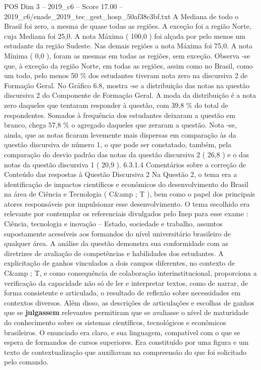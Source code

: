 \begin{textsample}{POS Dim 3 – 2019\_c6 – Score 17.00 – 2019\_c6/enade\_2019\_tec\_gest\_hosp\_50af38c3bf.txt}
A Mediana de todo o Brasil foi zero, a mesma de quase todas as regiões.
A exceção foi a região Norte, cuja Mediana foi 25,0.
A nota Máxima ( 100,0 ) foi alçada por pelo menos um estudante da região Sudeste.
Nas demais regiões a nota Máxima foi 75,0.
A nota Mínima ( 0,0 ), foram as mesmas em todas as regiões, sem exceção.
Observa -se que, à exceção da região Norte, em todas as regiões, assim como no Brasil, como um todo, pelo menos 50 \% dos estudantes tiveram nota zero na discursiva 2 de Formação Geral.
No Gráfico 6.8, mostra -se a distribuição das notas na questão discursiva 2 do Componente de Formação Geral.
A moda da distribuição é a nota zero daqueles que tentaram responder à questão, com 39,8 \% do total de respondentes.
Somados à frequência dos estudantes deixaram a questão em branco, chega 57,8 \% o agregado daqueles que zeraram a questão.
Nota -se, ainda, que as notas ficaram levemente mais dispersas em comparação às da questão discursiva de número 1, o que pode ser constatado, também, pela comparação do desvio padrão das notas da questão discursiva 2 ( 26,8 ) e o das notas da questão discursiva 1 ( 20,9 ). 6.3.1.4 Comentários sobre a correção de Conteúdo das respostas à Questão Discursiva 2 Na Questão 2, o tema era a identificação de impactos científicos e econômicos do desenvolvimento do Brasil na área de Ciência e Tecnologia ( C\&amp ; T ), bem como o papel dos principais atores responsáveis por impulsionar esse desenvolvimento.
O tema escolhido era relevante por contemplar os referenciais divulgados pelo Inep para esse exame : Ciência, tecnologia e inovação – Estado, sociedade e trabalho, assuntos supostamente acessíveis aos formandos do nível universitário brasileiro de qualquer área.
A análise da questão demonstra sua conformidade com as diretrizes de avaliação de competências e habilidades dos estudantes.
A explicitação de ganhos vinculados a dois campos diferentes, no contexto de C\&amp ; T, e como consequência de colaboração interinstitucional, proporciona a verificação da capacidade não só de ler e interpretar textos, como de narrar, de forma consistente e articulada, o resultado de reflexão sobre necessidades em contextos diversos.
Além disso, as descrições de articulações e escolhas de ganhos que se \textbf{julgassem} relevantes permitiram que se avaliasse o nível de maturidade do conhecimento sobre os sistemas científicos, tecnológicos e econômicos brasileiros.
O enunciado era claro, e sua linguagem, compatível com o que se espera de formandos de cursos superiores.
Era constituído por uma figura e um texto de contextualização que auxiliavam na compreensão do que foi solicitado pelo comando.

\end{textsample}
